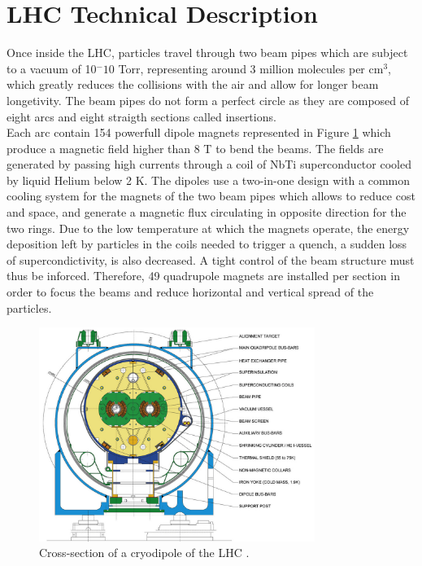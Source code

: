   \section{LHC Technical Description}

    Once inside the LHC, particles travel through two beam pipes which are subject to a vacuum of 10$^-10$ Torr, representing around 3 million molecules per cm$^3$, which greatly reduces the collisions with the air and allow for longer beam longetivity. The beam pipes do not form a perfect circle as they are composed of eight arcs and eight straigth sections called insertions. \\

    Each arc contain 154 powerfull dipole magnets represented in Figure \ref{fig:I-2-magnet} which produce a magnetic field higher than 8 T to bend the beams. The fields are generated by passing high currents through a coil of NbTi superconductor cooled by liquid Helium below 2 K. The dipoles use a two-in-one design with a common cooling system for the magnets of the two beam pipes which allows to reduce cost and space, and generate a magnetic flux circulating in opposite direction for the two rings. Due to the low temperature at which the magnets operate, the energy deposition left by particles in the coils needed to trigger a quench, a sudden loss of supercondictivity, is also decreased. A tight control of the beam structure must thus be inforced. Therefore, 49 quadrupole magnets are installed per section in order to focus the beams and reduce horizontal and vertical spread of the particles. \\

    \begin{figure}[h!]
			\centering
			\includegraphics[width=0.8\textwidth]{img/I-2-LHC/magnet.jpg}
			\caption{Cross-section of a cryodipole of the LHC \cite{Evans:2008zzb}.}
			\label{fig:I-2-magnet}
		\end{figure}

